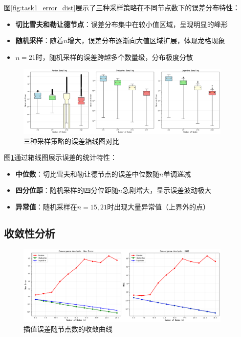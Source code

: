 \documentclass[a4paper,12pt]{article}
\theoremstyle{definition}
\begin{document}
图\ref{fig:task1_error_dist}展示了三种采样策略在不同节点数下的误差分布特性：
\begin{itemize}
    \item \textbf{切比雪夫和勒让德节点}：误差分布集中在较小值区域，呈现明显的峰形
    \item \textbf{随机采样}：随着$n$增大，误差分布逐渐向大值区域扩展，体现龙格现象
    \item $n=21$时，随机采样的误差跨越多个数量级，分布极度分散
\end{itemize}

\begin{figure}[H]
\centering
\includegraphics[width=0.95\textwidth]{results/task1/additional/error_boxplot.png}
\caption{三种采样策略的误差箱线图对比}
\label{fig:task1_error_boxplot}
\end{figure}

图\ref{fig:task1_error_boxplot}通过箱线图展示误差的统计特性：
\begin{itemize}
    \item \textbf{中位数}：切比雪夫和勒让德节点的误差中位数随$n$单调递减
    \item \textbf{四分位距}：随机采样的四分位距随$n$急剧增大，显示误差波动极大
    \item \textbf{异常值}：随机采样在$n=15, 21$时出现大量异常值（上界外的点）
\end{itemize}

\subsection{收敛性分析}

\begin{figure}[H]
\centering
\includegraphics[width=0.95\textwidth]{results/task1/additional/convergence_analysis.png}
\caption{插值误差随节点数的收敛曲线}
\label{fig:task1_convergence}
\end{figure}
\end{document}
